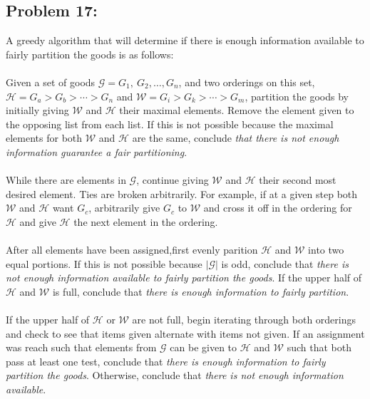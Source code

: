 \documentclass[12pt]{article}
\begin{document}
\subsection*{Problem 17:}
A greedy algorithm that will determine if there is enough
information available to fairly partition the goods is as 
follows:\\\\
Given a set of goods $\mathcal{G}={G_1,\ G_2,\dots,G_n}$,
and two orderings on this set, $\mathcal{H}=G_a > G_b >
\cdots > G_n$ and $\mathcal{W}=G_i > G_k > \cdots > G_m$,
partition the goods by initially giving $\mathcal{W}$ and 
$\mathcal{H}$ their maximal elements.
Remove the element given to the opposing list from each list.
If this is not possible
because the maximal elements for both $\mathcal{W}$ and
$\mathcal{H}$ are the same, conclude \textit{that there is not
enough information guarantee a fair partitioning}.\\\\  
While there are elements in $\mathcal{G}$, continue
giving $\mathcal{W}$ and $\mathcal{H}$ their second
most desired element.  Ties are broken arbitrarily.  For 
example, if at a given step both $\mathcal{W}$ and $\mathcal{H}$
want $G_c$, arbitrarily give $G_c$ to $\mathcal{W}$ and
cross it off in the ordering for $\mathcal{H}$ and give
$\mathcal{H}$ the next element in the ordering.\\\\
After all elements have been assigned,first evenly parition  
$\mathcal{H}$ and $\mathcal{W}$ into two equal portions.
If this is not possible because $|\mathcal{G}|$ is odd,
conclude that \textit{there is not enough information available
to fairly partition the goods}.  If the upper half of  
$\mathcal{H}$ and $\mathcal{W}$ is full, conclude that 
\textit{there is enough information to fairly partition}.\\\\
If the upper half of $\mathcal{H}$ or $\mathcal{W}$ are
not full, begin iterating through both orderings and 
check to see that items given alternate with items not given.
If an assignment was reach such that elements from $\mathcal{G}$
can be given to $\mathcal{H}$ and $\mathcal{W}$ such that both
pass at least one test, conclude that \textit{there is enough
information to fairly partition the goods}.  Otherwise, conclude
that \textit{there is not enough information available}.
\end{document}
